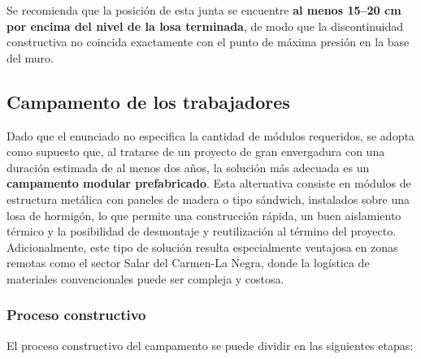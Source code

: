Se recomienda que la posición de esta junta se encuentre \textbf{al menos 15--20 cm por encima del nivel de la losa terminada}, de modo que la discontinuidad constructiva no coincida exactamente con el punto de máxima presión en la base del muro.

\subsection{Campamento de los trabajadores}

Dado que el enunciado no especifica la cantidad de módulos requeridos, se adopta como supuesto que, al tratarse de un proyecto de gran envergadura con una duración estimada de al menos dos años, la solución más adecuada es un \textbf{campamento modular prefabricado}. Esta alternativa consiste en módulos de estructura metálica con paneles de madera o tipo sándwich, instalados sobre una losa de hormigón, lo que permite una construcción rápida, un buen aislamiento térmico y la posibilidad de desmontaje y reutilización al término del proyecto. Adicionalmente, este tipo de solución resulta especialmente ventajosa en zonas remotas como el sector Salar del Carmen-La Negra, donde la logística de materiales convencionales puede ser compleja y costosa.

\subsubsection{Proceso constructivo}

El proceso constructivo del campamento se puede dividir en las siguientes etapas:

